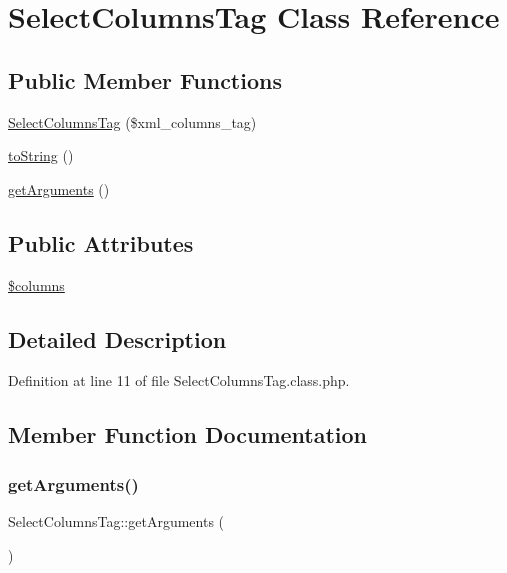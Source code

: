 \hypertarget{classSelectColumnsTag}{}\section{Select\+Columns\+Tag Class Reference}
\label{classSelectColumnsTag}
\subsection*{Public Member Functions}
\begin{DoxyCompactItemize}
\item 
\hyperlink{classSelectColumnsTag_a272d801d4a575217cd168a99bc7648a7}{Select\+Columns\+Tag} (\$xml\+\_\+columns\+\_\+tag)
\item 
\hyperlink{classSelectColumnsTag_a5780a3688343fd43d59071e966a64bef}{to\+String} ()
\item 
\hyperlink{classSelectColumnsTag_a2de673a98250ed2724826d5530113541}{get\+Arguments} ()
\end{DoxyCompactItemize}
\subsection*{Public Attributes}
\begin{DoxyCompactItemize}
\item 
\hyperlink{classSelectColumnsTag_a71af778e3ff63eedcd1c9db93274aeae}{\$columns}
\end{DoxyCompactItemize}


\subsection{Detailed Description}


Definition at line 11 of file Select\+Columns\+Tag.\+class.\+php.



\subsection{Member Function Documentation}
\mbox{\label{classSelectColumnsTag_a2de673a98250ed2724826d5530113541}} 
\subsubsection{\texorpdfstring{get\+Arguments()}{getArguments()}}
{\footnotesize\ttfamily Select\+Columns\+Tag\+::get\+Arguments (\begin{DoxyParamCaption}{ }\end{DoxyParamCaption})}

